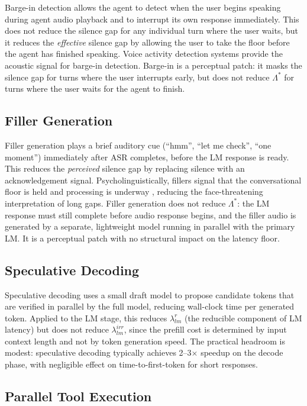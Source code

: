 Barge-in detection allows the agent to detect when the user begins speaking during
agent audio playback and to interrupt its own response immediately.
This does not reduce the silence gap for any individual turn where the user waits,
but it reduces the \emph{effective} silence gap by allowing the user to take the floor
before the agent has finished speaking.
Voice activity detection systems \citep{raux2008optimizing} provide the acoustic signal
for barge-in detection.
Barge-in is a perceptual patch: it masks the silence gap for turns where the user
interrupts early, but does not reduce $\Lambda^*$ for turns where the user waits for
the agent to finish.

\subsection{Filler Generation}

Filler generation plays a brief auditory cue (``hmm'', ``let me check'', ``one moment'')
immediately after ASR completes, before the LM response is ready.
This reduces the \emph{perceived} silence gap by replacing silence with an
acknowledgement signal.
Psycholinguistically, fillers signal that the conversational floor is held and
processing is underway \citep{levinson2015timing},
reducing the face-threatening interpretation of long gaps.
Filler generation does not reduce $\Lambda^*$:
the LM response must still complete before audio response begins,
and the filler audio is generated by a separate, lightweight model running in parallel
with the primary LM.
It is a perceptual patch with no structural impact on the latency floor.

\subsection{Speculative Decoding}

Speculative decoding \citep{leviathan2023fast} uses a small draft model to propose
candidate tokens that are verified in parallel by the full model,
reducing wall-clock time per generated token.
Applied to the LM stage, this reduces $\lambda_{lm}^r$ (the reducible component of LM latency)
but does not reduce $\lambda_{lm}^{irr}$,
since the prefill cost is determined by input context length
and not by token generation speed.
The practical headroom is modest: speculative decoding typically achieves 2--3$\times$
speedup on the decode phase,
with negligible effect on time-to-first-token for short responses.

\subsection{Parallel Tool Execution}

